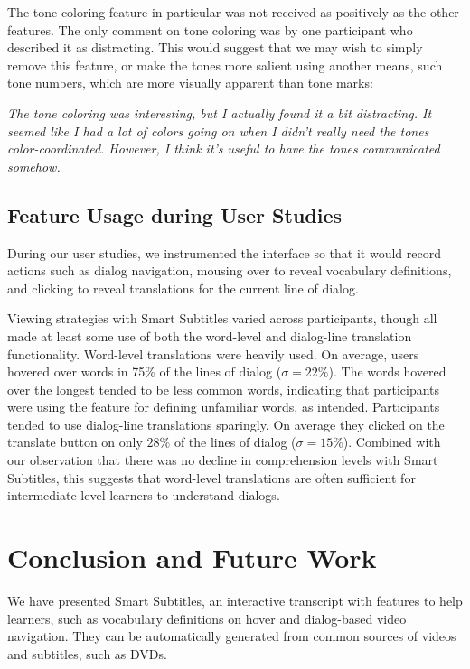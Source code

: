 \documentclass{sigchi}
\begin{document}
The tone coloring feature in particular was not received as positively as the other features. The only comment on tone coloring was by one participant who described it as distracting. This would suggest that we may wish to simply remove this feature, or make the tones more salient using another means, such tone numbers, which are more visually apparent than tone marks:
	 	 	
\emph{The tone coloring was interesting, but I actually found it a bit distracting. It seemed like I had a lot of colors going on when I didn't really need the tones color-coordinated. However, I think it's useful to have the tones communicated somehow.}

\subsection{Feature Usage during User Studies}

During our user studies, we instrumented the interface so that it would record actions such as dialog navigation, mousing over to reveal vocabulary definitions, and clicking to reveal translations for the current line of dialog.

Viewing strategies with Smart Subtitles varied across
participants, though all made at least some use of both
the word-level and dialog-line translation functionality.
Word-level translations were heavily used. On average,
users hovered over words in 75\% of the lines of dialog
($\sigma = 22\%$).
The words hovered over the longest tended to be less
common words, indicating that participants were using
the feature for defining unfamiliar words, as intended.
Participants tended to use dialog-line translations
sparingly. On average they clicked on the translate
button on only $28\%$ of the lines of dialog
($\sigma = 15\%$).
Combined with our observation that there was no decline in
comprehension levels with Smart Subtitles, this suggests
that word-level translations are often sufficient for
intermediate-level learners to understand dialogs.

\section{Conclusion and Future Work}

We have presented Smart Subtitles, an interactive
transcript with features to help learners, such as vocabulary
definitions on hover and dialog-based video navigation.
They can be automatically generated from
common sources of videos and subtitles, such as DVDs.
\end{document}

